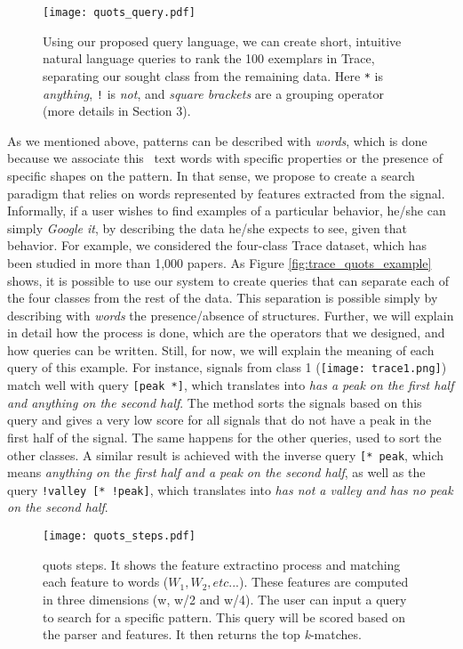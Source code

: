 \begin{figure}
    \centering
    \texttt{[image: quots\_query.pdf]}
    \caption{Using our proposed query language, we can create short, intuitive natural language queries to rank the 100 exemplars in Trace, separating our sought class from the remaining data. Here \texttt{*} is \textit{anything}, \texttt{!} is \textit{not}, and \textit{square brackets} are a grouping operator (more details in Section 3).}
    \label{fig:query_cold_start}
\end{figure}

As we mentioned above, patterns can be described with \textit{words}, which is done because we associate this \ text {words} with specific properties or the presence of specific shapes on the pattern. In that sense, we propose to create a search paradigm that relies on words represented by features extracted from the signal. Informally, if a user wishes to find examples of a particular behavior, he/she can simply \textit{Google it}, by describing the data he/she expects to see, given that behavior. For example, we considered the four-class Trace dataset, which has been studied in more than 1,000 papers. As Figure \ref{fig:trace_quots_example} shows, it is possible to use our system to create queries that can separate each of the four classes from the rest of the data. This separation is possible simply by describing with \textit{words} the presence/absence of structures. Further, we will explain in detail how the process is done, which are the operators that we designed, and how queries can be written. Still, for now, we will explain the meaning of each query of this example. For instance, signals from class 1 (\texttt{[image: trace1.png]}) match well with query \texttt{[peak *]}, which translates into \textit{has a peak on the first half and anything on the second half}. The method sorts the signals based on this query and gives a very low score for all signals that do not have a peak in the first half of the signal. The same happens for the other queries, used to sort the other classes. A similar result is achieved with the inverse query \texttt{[* peak}, which means \textit{anything on the first half and a peak on the second half}, as well as the query \texttt{!valley [* !peak]}, which translates into \textit{has not a valley and has no peak on the second half}.

\begin{figure}
\centering
\texttt{[image: quots\_steps.pdf]}
\caption{\gls{quots} steps. It shows the feature extractino process and matching each feature to words ($W_1, W_2, etc...$). These features are computed in three dimensions (w, w/2 and w/4). The user can input a query to search for a specific pattern. This query will be scored based on the parser and features. It then returns the top \textit{k}-matches.}
\label{fig:quots_steps}
\end{figure}

